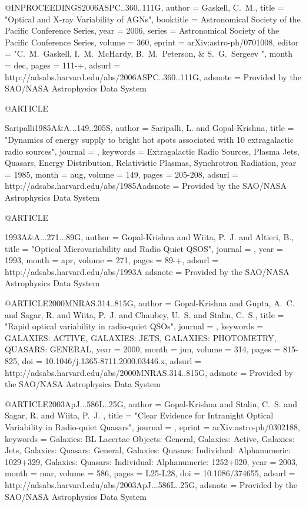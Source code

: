 \documentclass[twocolumn]{aastex62}
\begin{document}
@INPROCEEDINGS{2006ASPC..360..111G,
   author = {{Gaskell}, C.~M.},
    title = "{Optical and X-ray Variability of AGNs}",
booktitle = {Astronomical Society of the Pacific Conference Series},
     year = 2006,
   series = {Astronomical Society of the Pacific Conference Series},
   volume = 360,
   eprint = {arXiv:astro-ph/0701008},
   editor = "{C.~M.~Gaskell, I.~M.~McHardy, B.~M.~Peterson, \& S.~G.~Sergeev
	}",
    month = dec,
    pages = {111-+},
   adsurl = {http://adsabs.harvard.edu/abs/2006ASPC..360..111G},
  adsnote = {Provided by the SAO/NASA Astrophysics Data System}
}


@ARTICLE{Saripalli1985A&A...149..205S,
   author = {{Saripalli}, L. and {Gopal-Krishna}},
    title = "{Dynamics of energy supply to bright hot spots associated with 10 extragalactic radio sources}",
  journal = {\aap},
 keywords = {Extragalactic Radio Sources, Plasma Jets, Quasars, Energy Distribution, Relativistic Plasmas, Synchrotron Radiation},
     year = 1985,
    month = aug,
   volume = 149,
    pages = {205-208},
   adsurl = {http://adsabs.harvard.edu/abs/1985Aadsnote = {Provided by the SAO/NASA Astrophysics Data System}
}

@ARTICLE{1993A&A...271...89G,
   author = {{Gopal-Krishna} and {Wiita}, P.~J. and {Altieri}, B.},
    title = "{Optical Microvariability and Radio Quiet QSOS}",
  journal = {\aap},
     year = 1993,
    month = apr,
   volume = 271,
    pages = {89-+},
   adsurl = {http://adsabs.harvard.edu/abs/1993A
  adsnote = {Provided by the SAO/NASA Astrophysics Data System}
}



@ARTICLE{2000MNRAS.314..815G,
   author = {{Gopal-Krishna} and {Gupta}, A.~C. and {Sagar}, R. and {Wiita}, P.~J. and 
	{Chaubey}, U.~S. and {Stalin}, C.~S.},
    title = "{Rapid optical variability in radio-quiet QSOs}",
  journal = {\mnras},
 keywords = {GALAXIES: ACTIVE, GALAXIES: JETS, GALAXIES: PHOTOMETRY, QUASARS: GENERAL},
     year = 2000,
    month = jun,
   volume = 314,
    pages = {815-825},
      doi = {10.1046/j.1365-8711.2000.03446.x},
   adsurl = {http://adsabs.harvard.edu/abs/2000MNRAS.314..815G},
  adsnote = {Provided by the SAO/NASA Astrophysics Data System}
}


@ARTICLE{2003ApJ...586L..25G,
   author = {{Gopal-Krishna} and {Stalin}, C.~S. and {Sagar}, R. and {Wiita}, P.~J.
	},
    title = "{Clear Evidence for Intranight Optical Variability in Radio-quiet Quasars}",
  journal = {\apjl},
   eprint = {arXiv:astro-ph/0302188},
 keywords = {Galaxies: BL Lacertae Objects: General, Galaxies: Active, Galaxies: Jets, Galaxies: Quasars: General, Galaxies: Quasars: Individual: Alphanumeric: 1029+329, Galaxies: Quasars: Individual: Alphanumeric: 1252+020},
     year = 2003,
    month = mar,
   volume = 586,
    pages = {L25-L28},
      doi = {10.1086/374655},
   adsurl = {http://adsabs.harvard.edu/abs/2003ApJ...586L..25G},
  adsnote = {Provided by the SAO/NASA Astrophysics Data System}
}



}}
\end{document}
